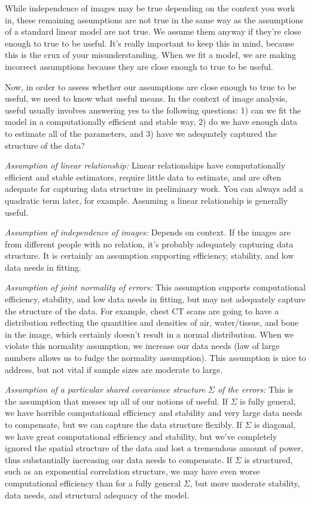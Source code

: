 \documentclass[12pt]{article}
\begin{document}
While independence of images may be true depending on the context you work in, these remaining assumptions are not true in the same way as the assumptions of a standard linear model are not true. We assume them anyway if they're close enough to true to be useful. It's really important to keep this in mind, because this is the crux of your misunderstanding. When we fit a model, we are making incorrect assumptions because they are close enough to true to be useful.

Now, in order to assess whether our assumptions are close enough to true to be useful, we need to know what useful means. In the context of image analysis, useful usually involves answering yes to the following questions: 1) can we fit the model in a computationally efficient and stable way, 2) do we have enough data to estimate all of the parameters, and 3) have we adequately captured the structure of the data?

\textit{Assumption of linear relationship:} Linear relationships have computationally efficient and stable estimators, require little data to estimate, and are often adequate for capturing data structure in preliminary work. You can always add a quadratic term later, for example. Assuming a linear relationship is generally useful.

\textit{Assumption of independence of images:} Depends on context. If the images are from different people with no relation, it's probably adequately capturing data structure. It is certainly an assumption supporting efficiency, stability, and low data needs in fitting.

\textit{Assumption of joint normality of errors:} This assumption supports computational efficiency, stability, and low data needs in fitting, but may not adequately capture the structure of the data. For example, chest CT scans are going to have a distribution reflecting the quantities and densities of air, water/tissue, and bone in the image, which certainly doesn't result in a normal distribution. When we violate this normality assumption, we increase our data needs (law of large numbers allows us to fudge the normality assumption). This assumption is nice to address, but not vital if sample sizes are moderate to large.

\textit{Assumption of a particular shared covariance structure $\Sigma$ of the errors:} This is the assumption that messes up all of our notions of useful. If $\Sigma$ is fully general, we have horrible computational efficiency and stability and very large data needs to compensate, but we can capture the data structure flexibly. If $\Sigma$ is diagonal, we have great computational efficiency and stability, but we've completely ignored the spatial structure of the data and lost a tremendous amount of power, thus substantially increasing our data needs to compensate. If $\Sigma$ is structured, such as an exponential correlation structure, we may have even worse computational efficiency than for a fully general $\Sigma$, but more moderate stability, data needs, and structural adequacy of the model.
\end{document}
